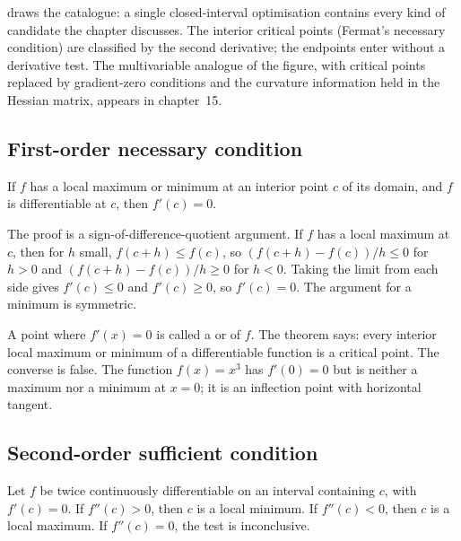 

 draws the catalogue: a
single closed-interval optimisation contains every kind of
candidate the chapter discusses. The interior critical points
(Fermat's necessary condition) are classified by the second
derivative; the endpoints enter without a derivative test. The
multivariable analogue of the figure, with critical points
replaced by gradient-zero conditions and the curvature
information held in the Hessian matrix, appears in chapter~15.

\subsection{First-order necessary condition}

\begin{theorem}
If $f$ has a local maximum or minimum at an interior point $c$ of
its domain, and $f$ is differentiable at $c$, then $f'(c) = 0$.
\end{theorem}

The proof is a sign-of-difference-quotient argument. If $f$ has a
local maximum at $c$, then for $h$ small, $f(c + h) \leq f(c)$,
so $(f(c + h) - f(c))/h \leq 0$ for $h > 0$ and
$(f(c + h) - f(c))/h \geq 0$ for $h < 0$. Taking the limit from
each side gives $f'(c) \leq 0$ and $f'(c) \geq 0$, so $f'(c) =
0$. The argument for a minimum is symmetric.

A point where $f'(x) = 0$ is called a 
or  of $f$. The theorem says: every
interior local maximum or minimum of a differentiable function is
a critical point. The converse is false. The function $f(x) =
x^{3}$ has $f'(0) = 0$ but is neither a maximum nor a minimum at
$x = 0$; it is an inflection point with horizontal tangent.

\subsection{Second-order sufficient condition}

\begin{theorem}
Let $f$ be twice continuously differentiable on an interval
containing $c$, with $f'(c) = 0$. If $f''(c) > 0$, then $c$ is a
local minimum. If $f''(c) < 0$, then $c$ is a local maximum. If
$f''(c) = 0$, the test is inconclusive.
\end{theorem}

